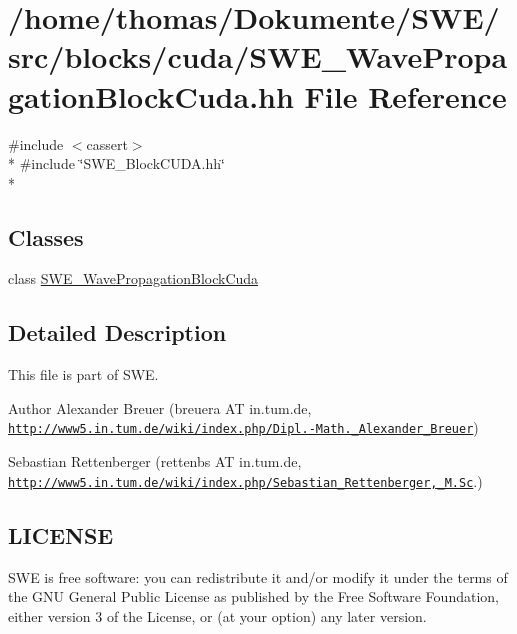 \hypertarget{SWE__WavePropagationBlockCuda_8hh}{\section{/home/thomas/\-Dokumente/\-S\-W\-E/src/blocks/cuda/\-S\-W\-E\-\_\-\-Wave\-Propagation\-Block\-Cuda.hh File Reference}
\label{SWE__WavePropagationBlockCuda_8hh}
}
{\ttfamily \#include $<$cassert$>$}\\*
{\ttfamily \#include \char`\"{}S\-W\-E\-\_\-\-Block\-C\-U\-D\-A.\-hh\char`\"{}}\\*
\subsection*{Classes}
\begin{DoxyCompactItemize}
\item 
class \hyperlink{classSWE__WavePropagationBlockCuda}{S\-W\-E\-\_\-\-Wave\-Propagation\-Block\-Cuda}
\end{DoxyCompactItemize}


\subsection{Detailed Description}
This file is part of S\-W\-E.

\begin{DoxyAuthor}{Author}
Alexander Breuer (breuera A\-T in.\-tum.\-de, \href{http://www5.in.tum.de/wiki/index.php/Dipl.-Math._Alexander_Breuer}{\tt http\-://www5.\-in.\-tum.\-de/wiki/index.\-php/\-Dipl.-\/\-Math.\-\_\-\-Alexander\-\_\-\-Breuer}) 

Sebastian Rettenberger (rettenbs A\-T in.\-tum.\-de, \href{http://www5.in.tum.de/wiki/index.php/Sebastian_Rettenberger,_M.Sc}{\tt http\-://www5.\-in.\-tum.\-de/wiki/index.\-php/\-Sebastian\-\_\-\-Rettenberger,\-\_\-\-M.\-Sc}.)
\end{DoxyAuthor}
\hypertarget{Writer_8hh_LICENSE}{}\subsection{L\-I\-C\-E\-N\-S\-E}\label{Writer_8hh_LICENSE}
S\-W\-E is free software\-: you can redistribute it and/or modify it under the terms of the G\-N\-U General Public License as published by the Free Software Foundation, either version 3 of the License, or (at your option) any later version.

